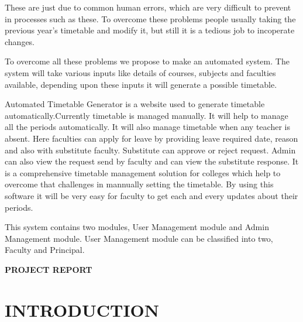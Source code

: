         These are just due to common human errors, which are very difficult to prevent in processes such as these. To overcome these problems people usually taking the previous year’s timetable and modify it, but still it is a tedious job to incoperate changes.


          To overcome all these problems we propose to make an automated system. The system will take various inputs like details of courses, subjects and faculties available, depending upon these inputs it will generate a possible timetable.


        Automated Timetable Generator is a website used to generate timetable automatically.Currently timetable is managed manually. It will help to manage all the periods automatically. It will also manage timetable when any teacher is absent. Here faculties can apply for leave by providing leave required date, reason and also with substitute faculty. Substitute can approve or reject request. Admin can also view the request send by faculty and can view the substitute response. 
	It is a comprehensive timetable management solution for colleges which help to overcome that challenges in mannually setting the timetable. By using this software it will be very easy for faculty to get each and every updates about their periods. 


	This system contains two modules, User Management module and Admin Management module. User Management module can be classified into two, Faculty and Principal.

%
%
%
\clearpage
{}
\tableofcontents
%
%
\clearpage
{}
\listoftables
%
%
\clearpage
{}
\listoffigures
%
%
\mainmatter
%
\clearpage
\quad\vfill
\begin{center}
{\Huge \bf PROJECT REPORT}
\end{center}
\vfill
\clearpage
%
%
% 
%
%
%  
\chapter{INTRODUCTION}
%
